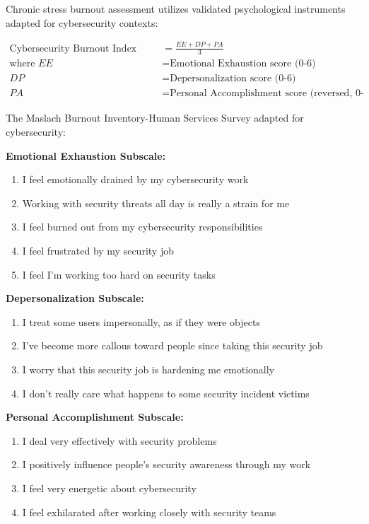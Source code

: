 \documentclass[11pt,a4paper]{article}
\begin{document}
Chronic stress burnout assessment utilizes validated psychological instruments adapted for cybersecurity contexts:

\begin{align}
\text{Cybersecurity Burnout Index (CBI)} &= \frac{EE + DP + PA}{3} \\
\text{where } EE &= \text{Emotional Exhaustion score (0-6)} \\
DP &= \text{Depersonalization score (0-6)} \\
PA &= \text{Personal Accomplishment score (reversed, 0-6)}
\end{align}

The Maslach Burnout Inventory-Human Services Survey adapted for cybersecurity:

\textbf{Emotional Exhaustion Subscale:}
\begin{enumerate}
\item I feel emotionally drained by my cybersecurity work
\item Working with security threats all day is really a strain for me
\item I feel burned out from my cybersecurity responsibilities
\item I feel frustrated by my security job
\item I feel I'm working too hard on security tasks
\end{enumerate}

\textbf{Depersonalization Subscale:}
\begin{enumerate}
\item I treat some users impersonally, as if they were objects
\item I've become more callous toward people since taking this security job
\item I worry that this security job is hardening me emotionally
\item I don't really care what happens to some security incident victims
\end{enumerate}

\textbf{Personal Accomplishment Subscale:}
\begin{enumerate}
\item I deal very effectively with security problems
\item I positively influence people's security awareness through my work
\item I feel very energetic about cybersecurity
\item I feel exhilarated after working closely with security teams
\end{enumerate}
\end{document}
